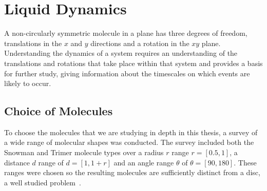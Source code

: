 \chapter{Liquid Dynamics}

A non-circularly symmetric molecule in a plane has three degrees of freedom, translations in the $x$ and $y$ directions and a rotation in the $xy$ plane. Understanding the dynamics of a system requires an understanding of the translations and rotations that take place within that system and provides a basis for further study, giving information about the timescales on which events are likely to occur.

\section{Choice of Molecules}

To choose the molecules that we are studying in depth in this thesis, a survey of a wide range of molecular shapes was conducted. The survey included both the Snowman and Trimer molecule types over a radius $r$ range $r = [0.5,1]$, a distance $d$ range of $d = [1,1+r]$ and an angle range $\theta$ of $\theta = [90,180]$. These ranges were chosen so the resulting molecules are sufficiently distinct from a disc, a well studied problem~\cite{verlet:67}.

